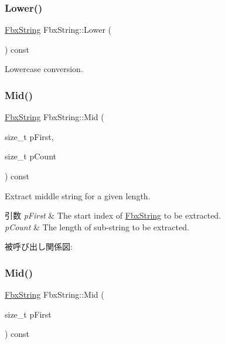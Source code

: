 \subsubsection{\texorpdfstring{Lower()}{Lower()}}
{\footnotesize\ttfamily \hyperlink{class_fbx_string}{Fbx\+String} Fbx\+String\+::\+Lower (\begin{DoxyParamCaption}{ }\end{DoxyParamCaption}) const}



Lowercase conversion. 

\mbox{\label{class_fbx_string_a308c70f64a1f9504e550438af97a3eeb}} 
\subsubsection{\texorpdfstring{Mid()}{Mid()}\hspace{0.1cm}{\footnotesize\ttfamily [1/2]}}
{\footnotesize\ttfamily \hyperlink{class_fbx_string}{Fbx\+String} Fbx\+String\+::\+Mid (\begin{DoxyParamCaption}\item[{size\+\_\+t}]{p\+First,  }\item[{size\+\_\+t}]{p\+Count }\end{DoxyParamCaption}) const}

Extract middle string for a given length. 
\begin{DoxyParams}{引数}
{\em p\+First} & The start index of \hyperlink{class_fbx_string}{Fbx\+String} to be extracted. \\
\hline
{\em p\+Count} & The length of sub-\/string to be extracted. \\
\hline
\end{DoxyParams}
被呼び出し関係図\+:
\mbox{\label{class_fbx_string_abec59547bba055c6f339e77be28feb0a}} 
\subsubsection{\texorpdfstring{Mid()}{Mid()}\hspace{0.1cm}{\footnotesize\ttfamily [2/2]}}
{\footnotesize\ttfamily \hyperlink{class_fbx_string}{Fbx\+String} Fbx\+String\+::\+Mid (\begin{DoxyParamCaption}\item[{size\+\_\+t}]{p\+First }\end{DoxyParamCaption}) const}

